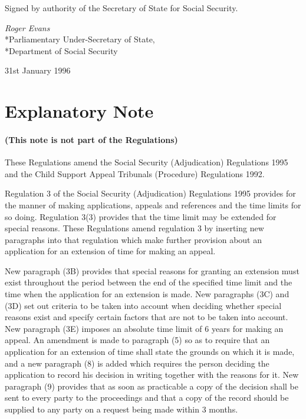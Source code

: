 \documentclass[12pt,a4paper]{article}
\begin{document}
\bigskip

Signed by authority of the Secretary of State for Social Security.

{\raggedleft
\emph{Roger Evans}\\*Parliamentary Under-Secretary of State,\\*Department of Social Security

}

31st January 1996

\small

\part{Explanatory Note}

\renewcommand\parthead{--- Explanatory Note}

\subsection*{(This note is not part of the Regulations)}

These Regulations amend the Social Security (Adjudication) Regulations 1995 and the Child Support Appeal Tribunals (Procedure) Regulations 1992.

  Regulation 3 of the Social Security (Adjudication) Regulations 1995 provides for the manner of making applications, appeals and references and the time limits for so doing. Regulation 3(3) provides that the time limit may be extended for special reasons. These Regulations amend regulation 3 by inserting new paragraphs into that regulation which make further provision about an application for an extension of time for making an appeal.

  New paragraph (3B) provides that special reasons for granting an extension must exist throughout the period between the end of the specified time limit and the time when the application for an extension is made. New paragraphs (3C) and (3D) set out criteria to be taken into account when deciding whether special reasons exist and specify certain factors that are not to be taken into account. New paragraph (3E) imposes an absolute time limit of 6 years for making an appeal. An amendment is made to paragraph (5) so as to require that an application for an extension of time shall state the grounds on which it is made, and a new paragraph (8) is added which requires the person deciding the application to record his decision in writing together with the reasons for it. New paragraph (9) provides that as soon as practicable a copy of the decision shall be sent to every party to the proceedings and that a copy of the record should be supplied to any party on a request being made within 3 months.
\end{document}
